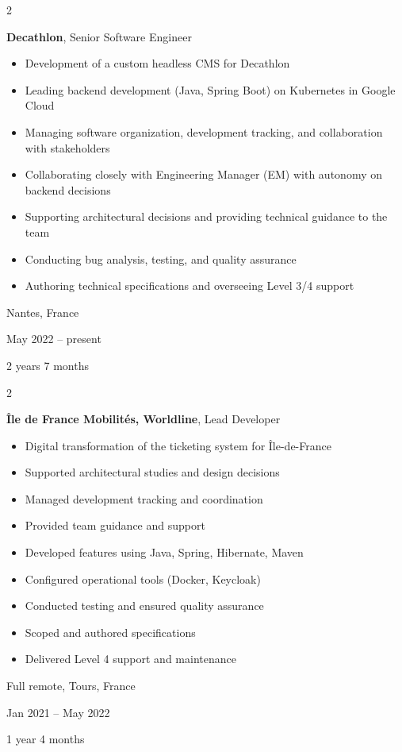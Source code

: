 \documentclass[10pt, letterpaper]{article}
\newenvironment{highlights}{
    \begin{itemize}[
        topsep=0.10 cm,
        parsep=0.10 cm,
        partopsep=0pt,
        itemsep=0pt,
        leftmargin=0.4 cm + 10pt
    ]
}{
    \end{itemize}
} %
\newenvironment{twocolentry}[2][]{
    \onecolentry
    \def\secondColumn{#2}
    \setcolumnwidth{\fill, 4.5 cm}
    \begin{paracol}{2}
}{
    \switchcolumn \raggedleft \secondColumn
    \end{paracol}
    \endonecolentry
} %
\begin{document}
        
        \begin{twocolentry}{
            Nantes, France

        May 2022 – present

        2 years 7 months
        }
            \textbf{Decathlon}, Senior Software Engineer
            \begin{highlights}
                \item Development of a custom headless CMS for Decathlon
                \item Leading backend development (Java, Spring Boot) on Kubernetes in Google Cloud
                \item Managing software organization, development tracking, and collaboration with stakeholders
                \item Collaborating closely with Engineering Manager (EM) with autonomy on backend decisions
                \item Supporting architectural decisions and providing technical guidance to the team
                \item Conducting bug analysis, testing, and quality assurance
                \item Authoring technical specifications and overseeing Level 3/4 support
            \end{highlights}
        \end{twocolentry}


        \vspace{0.2 cm}

        \begin{twocolentry}{
            Full remote, Tours, France

        Jan 2021 – May 2022

        1 year 4 months
        }
            \textbf{Île de France Mobilités, Worldline}, Lead Developer
            \begin{highlights}
                \item Digital transformation of the ticketing system for Île-de-France
                \item Supported architectural studies and design decisions
                \item Managed development tracking and coordination
                \item Provided team guidance and support
                \item Developed features using Java, Spring, Hibernate, Maven
                \item Configured operational tools (Docker, Keycloak)
                \item Conducted testing and ensured quality assurance
                \item Scoped and authored specifications
                \item Delivered Level 4 support and maintenance
            \end{highlights}
        \end{twocolentry}
\end{document}
